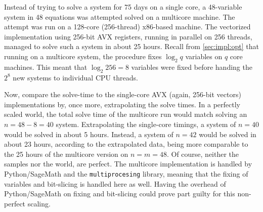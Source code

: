 Instead of trying to solve a system for 75 days on a single core, a 48-variable system in 48 equations was attempted solved on a multicore machine. The attempt was run on a 128-core (256-thread) x86-based machine. The vectorized implementation using 256-bit AVX registers, running in parallel on 256 threads, managed to solve such a system in about 25 hours. Recall from \cref{sec:impl:opt} that running on a multicore system, the procedure fixes $\log_2 q$ variables on $q$ core machines. This meant that $\log_2 256 = 8$ variables were fixed before handing the $2^8$ new systems to individual CPU threads. 

Now, compare the solve-time to the single-core AVX (again, 256-bit vectors) implementations by, once more, extrapolating the solve times. In a perfectly scaled world, the total solve time of the multicore run would match solving an $n = 48 - 8 = 40$ system. Extrapolating the single-core timings, a system of $n = 40$ would be solved in about 5 hours. Instead, a system of $n = 42$ would be solved in about 23 hours, according to the extrapolated data, being more comparable to the 25 hours of the multicore version on $n = m = 48$. Of course, neither the samples nor the world, are perfect. The multicore implementation is handled by Python/SageMath and the \texttt{multiprocesing} library, meaning that the fixing of variables and bit-slicing is handled here as well. Having the overhead of Python/SageMath on fixing and bit-slicing could prove part guilty for this non-perfect scaling. 

\newpage